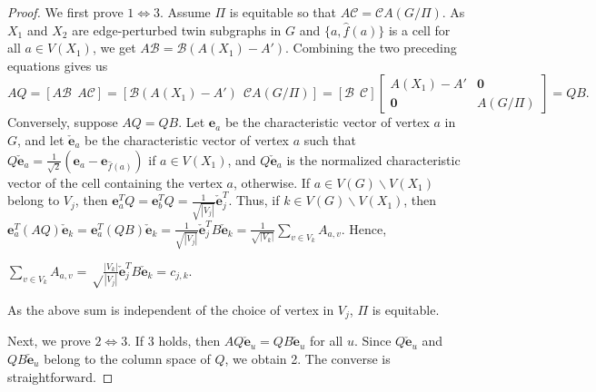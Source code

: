 \documentclass[12pt,a4paper]{article}
\def \e {{\bf e}}
\def \e {{\mathbf e}}
\newcommand\sarojini[1]{{\bf \textcolor{magenta}{(Sarojini: #1)}}}
\begin{document}
\begin{proof}
We first prove $1\Leftrightarrow 3$. Assume $\Pi$ is equitable so that $A\mathcal{C}=\mathcal{C}A(G/\Pi)$. As $X_1$ and $X_2$ are edge-perturbed twin subgraphs in $G$ and $\{a,\hat{f}(a)\}$ is a cell for all $a\in V (X_1)$, we get $A\mathcal{B}=\mathcal{B}(A(X_1)-A')$. Combining the two preceding equations gives us
\begin{equation*}
AQ=[A\mathcal{B}~~A\mathcal{C}]=[\mathcal{B}(A(X_1)-A')~~\mathcal{C}A(G/\Pi)]=[\mathcal{B}~~\mathcal{C}]\begin{bmatrix}
     A(X_1)-A' & \mathbf{0}\\
     \mathbf{0} & A(G/\Pi)
     \end{bmatrix}=QB.
\end{equation*}
Conversely, suppose $AQ=QB$. %
Let $\e_a$ be the characteristic vector of vertex $a$ in $G$, and let $\check{\e}_a$ be the characteristic vector of vertex $a$ such that $Q\check{\e}_a=\frac{1}{\sqrt{2}}(\e_a-\e_{\hat{f}(a)})$ if $a\in V(X_1)$, and $Q\check{\e}_a$ is the normalized characteristic vector of the cell containing the vertex $a$, otherwise. If $a\in V(G)\backslash V(X_1)$ belong to $V_j$, then $\e_a^TQ=\e_b^TQ=\frac{1}{\sqrt{|V_j|}}\check{\e}_j^T$. Thus, if $k\in V(G)\backslash V(X_1)$, then 
$\e_a^T(AQ)\check{\e}_k=\e_a^T(QB)\check{\e}_k=\frac{1}{\sqrt{|V_j|}}\check{\e}_j^TB\check{\e}_k=\frac{1}{\sqrt{|V_k|}}\displaystyle\sum_{v\in V_k}A_{a,v}$. Hence,
\begin{center}
$\displaystyle\sum_{v\in V_k}A_{a,v}= \sqrt\frac{|V_k|}{|V_j|}\check{\e}_j^TB\check{\e}_k=c_{j,k}.$
\end{center}
As the above sum is independent of the choice of vertex in $V_j$, $\Pi$ is equitable. %


Next, we prove $2\Leftrightarrow 3$. If 3 holds, then $AQ\check{\e}_u=QB\check{\e}_u$ for all $u$. Since $Q\check{\e}_u$ and $QB\check{\e}_u$ belong to the column space of $Q$, we obtain 2. The converse is straightforward.


\end{proof}
\end{document}
